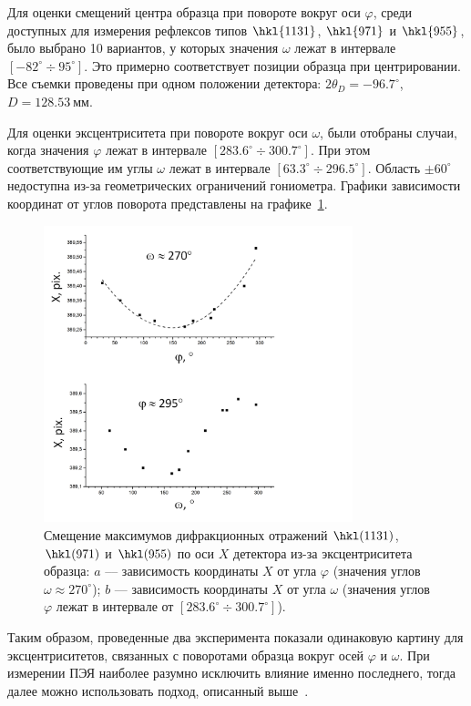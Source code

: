 \documentclass[a4paper,14pt]{extarticle}
\newcommand{\unit}[1]{ \ \text{#1}}
\newcommand{\degree}{^\circ}
\newcommand{\range}[2]{[#1\div#2]}
\begin{document}
Для оценки смещений центра образца при повороте вокруг оси $\varphi$, среди доступных для измерения рефлексов типов $\hkl{11 3 1}$, $\hkl{9 7 1}$ и $\hkl{9 5 5}$, было выбрано 10 вариантов, у которых значения $\omega$ лежат в интервале $\range{-82\degree}{95\degree}$.
Это примерно соответствует позиции образца при центрировании.
Все съемки проведены при одном положении детектора: $2\theta_D = -96.7\degree$, $D = 128.53\unit{мм}$.

Для оценки эксцентриситета при повороте вокруг оси $\omega$, были отобраны случаи, когда значения $\varphi$ лежат в интервале $\range{283.6\degree}{300.7\degree}$.
При этом соответствующие им углы $\omega$ лежат в интервале $\range{63.3\degree}{296.5\degree}$.
Область $\pm 60\degree$ недоступна из-за геометрических ограничений гониометра.
Графики зависимости координат от углов поворота представлены на графике~\ref{fig:eccentrSi}.

\begin{figure}[ht!]
    \centering
    \includegraphics[width=0.8\textwidth]{eccentrSi.png}
    \caption{Смещение максимумов дифракционных отражений $\hkl(11 3 1)$, $\hkl(9 7 1)$ и $\hkl(9 5 5)$ по оси $X$ детектора из-за эксцентриситета образца: $a$ --– зависимость координаты $X$ от угла $\varphi$ (значения углов $\omega \approx 270\degree$); $b$ --- зависимость координаты $X$ от угла $\omega$ (значения углов $\varphi$ лежат в интервале от $\range{283.6\degree}{300.7\degree}$).}
    \label{fig:eccentrSi}
\end{figure}

Таким образом, проведенные два эксперимента показали одинаковую картину для эксцентриситетов, связанных с поворотами образца вокруг осей $\varphi$ и $\omega$.
При измерении ПЭЯ наиболее разумно исключить влияние именно последнего, тогда далее можно использовать подход, описанный выше~\cite{Ponomarev:1969}.
\end{document}
